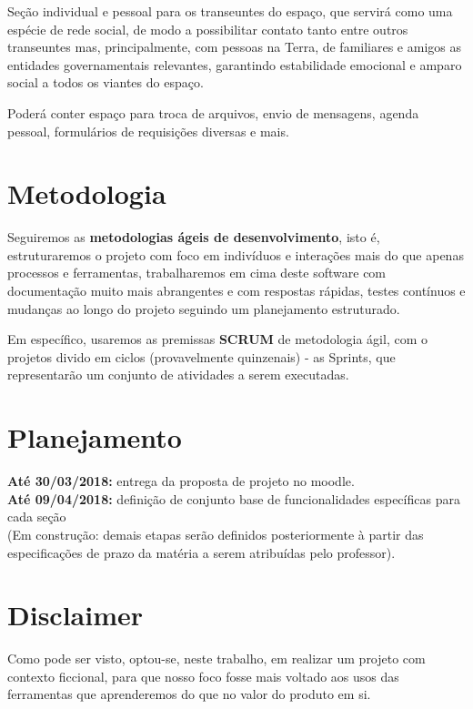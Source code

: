 \documentclass[12pt]{exam}
\begin{document}
    Seção individual e pessoal para os transeuntes do espaço, que servirá como uma espécie de rede social, de modo a possibilitar contato tanto entre outros transeuntes mas, principalmente, com pessoas na Terra, de familiares e amigos as entidades governamentais relevantes, garantindo estabilidade emocional e amparo social a todos os viantes do espaço. 
    
    Poderá conter espaço para troca de arquivos, envio de mensagens, agenda pessoal, formulários de requisições diversas e mais.  \\
    
    
\section{Metodologia}

        Seguiremos as \textbf{metodologias ágeis de desenvolvimento}, isto é, estruturaremos o projeto com foco em indivíduos e interações mais do que apenas processos e ferramentas, trabalharemos em cima deste software com documentação muito mais abrangentes e com respostas rápidas, testes contínuos e mudanças ao longo do projeto seguindo um planejamento estruturado.
        
    Em específico, usaremos as premissas \textbf{SCRUM} de metodologia ágil, com o projetos divido em ciclos (provavelmente quinzenais) - as Sprints, que representarão um conjunto de atividades a serem executadas. 
    
\section{Planejamento}
        \textbf{Até 30/03/2018:} entrega da proposta de projeto no moodle. \\    
    \textbf{Até 09/04/2018:} definição de conjunto base de funcionalidades específicas para cada seção \\
    
        (Em construção: demais etapas serão definidos posteriormente à partir das especificações de prazo da matéria a serem atribuídas pelo professor). \\
    
\section{Disclaimer}
        
        Como pode ser visto, optou-se, neste trabalho, em realizar um projeto com contexto ficcional, para que nosso foco fosse mais voltado aos usos das ferramentas que  aprenderemos do que no valor do produto em si. 
    

         
        
        
        
\end{document}
